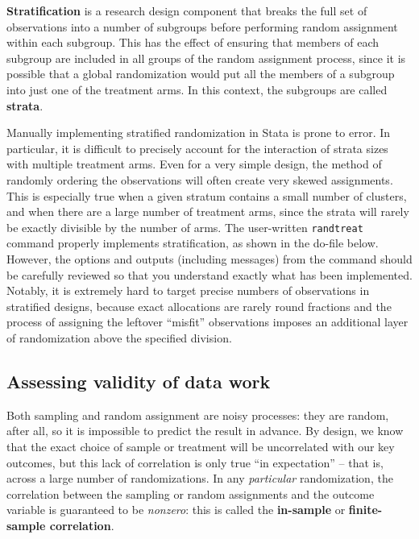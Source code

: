 \textbf{Stratification} is a research design component
that breaks the full set of observations into a number of subgroups
before performing random assignment within each subgroup.
This has the effect of ensuring that members of each subgroup
are included in all groups of the random assignment process,
since it is possible that a global randomization
would put all the members of a subgroup into just one of the treatment arms.
In this context, the subgroups are called \textbf{strata}.

Manually implementing stratified randomization in Stata is prone to error.
In particular, it is difficult to precisely account
for the interaction of strata sizes with multiple treatment arms.
Even for a very simple design, the method of randomly ordering the observations
will often create very skewed assignments.
This is especially true when a given stratum contains a small number of clusters,
and when there are a large number of treatment arms,
since the strata will rarely be exactly divisible by the number of arms.\cite{carril2017dealing}
The user-written \texttt{randtreat} command properly implements stratification,
as shown in the do-file below. %
However, the options and outputs (including messages) from the command should be carefully reviewed
so that you understand exactly what has been implemented.
Notably, it is extremely hard to target precise numbers of observations
in stratified designs, because exact allocations are rarely round fractions
and the process of assigning the leftover ``misfit'' observations
imposes an additional layer of randomization above the specified division.




\subsection{Assessing validity of data work}

Both sampling and random assignment are noisy processes:
they are random, after all, so it is impossible to predict the result in advance.
By design, we know that the exact choice of sample or treatment
will be uncorrelated with our key outcomes,
but this lack of correlation is only true ``in expectation'' --
that is, across a large number of randomizations.
In any \textit{particular} randomization,
the correlation between the sampling or random assignments and the outcome variable
is guaranteed to be \textit{nonzero}:
this is called the \textbf{in-sample} or \textbf{finite-sample correlation}.

